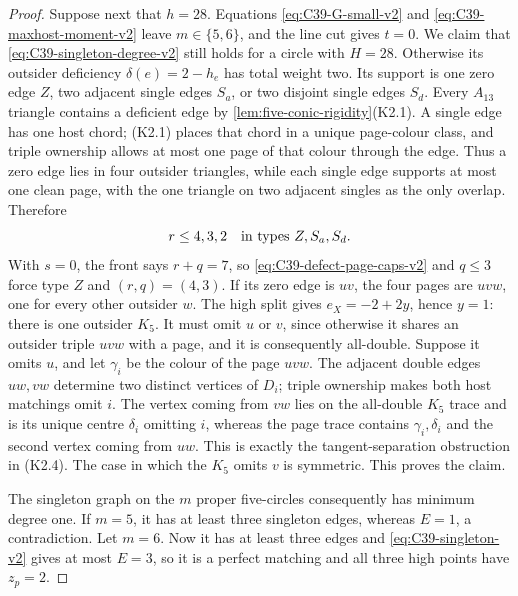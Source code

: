 \begin{proof}
Suppose next that \(h=28\).
Equations \eqref{eq:C39-G-small-v2} and
\eqref{eq:C39-maxhost-moment-v2} leave
\(m\in\{5,6\}\),
and the line cut gives \(t=0\).  We claim that
\eqref{eq:C39-singleton-degree-v2} still holds for a circle
with \(H=28\).  Otherwise its outsider deficiency
\(\delta(e)=2-h_e\) has total weight two.  Its support is one zero edge
\(Z\), two adjacent single edges \(S_a\), or two disjoint single edges
\(S_d\).  Every \(A_{13}\) triangle contains a deficient edge by
\cref{lem:five-conic-rigidity}(K2.1).  A single edge has one host chord;
(K2.1) places that chord in a unique page-colour class, and triple ownership
allows at most one page of that colour through the edge.  Thus a zero edge
lies in four outsider triangles, while each single edge supports at most one
clean page, with the one
triangle on two adjacent singles as the only overlap.  Therefore
\begin{equation}\label{eq:C39-defect-page-caps-v2}
 r\le4,3,2\quad\hbox{in types }Z,S_a,S_d.
\end{equation}
With \(s=0\), the front says \(r+q=7\), so
\eqref{eq:C39-defect-page-caps-v2} and \(q\le3\) force type
\(Z\) and \((r,q)=(4,3)\).  If its zero edge is \(uv\), the four pages are
\(uvw\), one for every other outsider \(w\).  The high split gives
\(e_X=-2+2y\), hence \(y=1\): there is one outsider \(K_5\).  It must omit
\(u\) or \(v\), since otherwise it shares an outsider triple \(uvw\) with
a page, and it is consequently all-double.  Suppose it omits \(u\), and
let \(\gamma_i\) be the colour of the page \(uvw\).  The adjacent double
edges \(uw,vw\) determine two distinct vertices of \(D_i\); triple
ownership makes both host matchings omit \(i\).  The vertex coming from
\(vw\) lies on the all-double \(K_5\) trace and is its unique centre
\(\delta_i\) omitting \(i\), whereas the page trace contains
\(\gamma_i,\delta_i\) and the second vertex coming from \(uw\).  This is
exactly the tangent-separation obstruction in (K2.4).  The case in which
the \(K_5\) omits \(v\) is symmetric.  This proves the claim.

The singleton graph on the \(m\) proper five-circles consequently has
minimum degree one.  If \(m=5\), it has at least three singleton edges,
whereas \(E=1\), a contradiction.  Let \(m=6\).  Now it has at least three
edges and \eqref{eq:C39-singleton-v2} gives at most \(E=3\), so it is a
perfect matching and all three high points have \(z_p=2\).


\end{proof}
